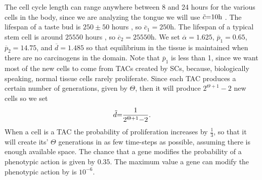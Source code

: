 \documentclass[\main/thesis.tex]{subfiles}
\begin{document}
The cell cycle length can range anywhere between 8 and 24 hours for the various cells in the body, since we are analyzing the tongue we will use $\Tilde{c} {=} 10 \text{h}$ \cite{Beidler}. The lifespan of a taste bud is $250{\pm}50$ hours \cite{Beidler}, so $\overline{c}_1 {=} 250 \text{h}$. The lifespan of a typical stem cell is around $25550$ hours \cite{Sieburg}, so $\overline{c}_2 {=} 25550 \text{h}$. We set $\overline{\alpha} {=} 1.625$, $\overline{p}_1 {=} 0.65$, $\overline{p}_2 {=} 14.75$, and $\overline{d} {=} 1.485$ so that equilibrium in the tissue is maintained when there are no carcinogens in the domain. Note that $\overline{p}_1$ is less than 1, since we want most of the new cells to come from TACs created by SCs, because, biologically speaking, normal tissue cells rarely proliferate. Since each TAC produces a certain number of generations, given by $\Theta$, then it will produce $2^{\Theta {+} 1} {-} 2$ new cells so we set 
\begin{equation}
\Tilde{d} {=} \frac{1}{2^{\Theta {+} 1} {-} 2}.
\label{param:probabilityDiff}
\end{equation}
When a cell is a TAC the probability of proliferation increases by $\frac{1}{3}$, so that it will create its' $\Theta$ generations in as few time-steps as possible, assuming there is enough available space. The chance that a gene modifies the probability of a phenotypic action is given by $0.35$. The maximum value a gene can modify the phenotypic action by is $10^{\minus 6}$. 
\end{document}
